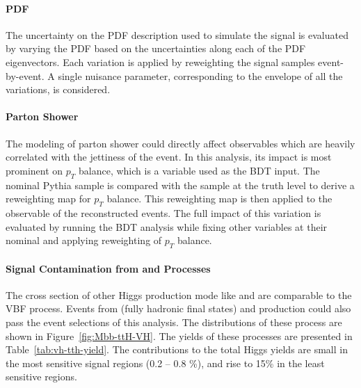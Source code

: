 

\paragraph{PDF}
The uncertainty on the PDF description used to simulate the signal is evaluated
by varying the PDF based on the uncertainties along each of the PDF eigenvectors.
Each variation is applied by reweighting the signal samples event-by-event.
A single nuisance parameter, corresponding to the envelope of all the variations,
is considered.

\paragraph{Parton Shower}

The modeling of parton shower could directly affect observables which are heavily 
correlated with the jettiness of the event. In this analysis, its impact is most 
prominent on $p_{T}$ balance, which is a variable used as the BDT input. The nominal
Pythia sample is compared with the \herwig{} sample at the truth level to derive a 
reweighting map for $p_{T}$ balance.
This reweighting map is then applied to the observable of the reconstructed events. The full impact of this variation 
is evaluated by running the BDT analysis while fixing other variables at their nominal 
and applying reweighting of $p_{T}$ balance. 


\paragraph{Signal Contamination from \VH and \ttH Processes}

The cross section of other Higgs production mode like \VH and \ttH are comparable to
the VBF process. Events from \VH (fully hadronic final states) and \ttH production could 
also pass the event selections of this analysis. The \Mbb distributions of these process
 are shown in Figure~\ref{fig:Mbb-ttH-VH}. The yields of these processes are presented 
in Table~\ref{tab:vh-tth-yield}.  The contributions to the total Higgs yields are  small 
in the most sensitive signal regions (0.2 -- 0.8 \%),  and rise to 15\% in the least sensitive regions.  

